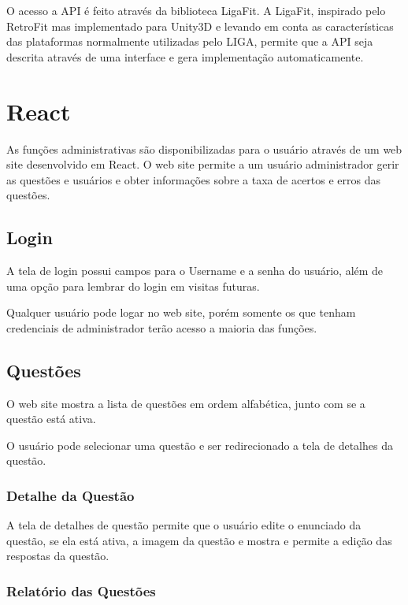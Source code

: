 O acesso a API é feito através da biblioteca LigaFit. A LigaFit, inspirado pelo RetroFit mas implementado para Unity3D e levando em conta as características das plataformas normalmente utilizadas pelo LIGA, permite que a API seja descrita através de uma interface e gera implementação automaticamente.


\section{React}
\label{sec:react}
As funções administrativas são disponibilizadas para o usuário através de um web site desenvolvido em React\cite{react}. O web site permite a um usuário administrador gerir as questões e usuários e obter informações sobre a taxa de acertos e erros das questões. 

\subsection{Login}
\label{subsec:loginreact}

A tela de login possui campos para o Username e a senha do usuário, além de uma opção para lembrar do login em visitas futuras.

Qualquer usuário pode logar no web site, porém somente os que tenham credenciais de administrador terão acesso a maioria das funções.


\subsection{Questões}
\label{subsec:questoesreact}

O web site  mostra a lista de questões em ordem alfabética, junto com se a questão está ativa.
    
O usuário pode selecionar uma questão e ser redirecionado a tela de detalhes da questão.


\subsubsection{Detalhe da Questão}
\label{subsubsec:detalhequestao}

A tela de detalhes de questão permite que o usuário edite o enunciado da questão, se ela está ativa, a imagem da questão e mostra e permite a edição das respostas da questão.


\subsubsection{Relatório das Questões}
\label{subsubsec:relatorioquestoes}

